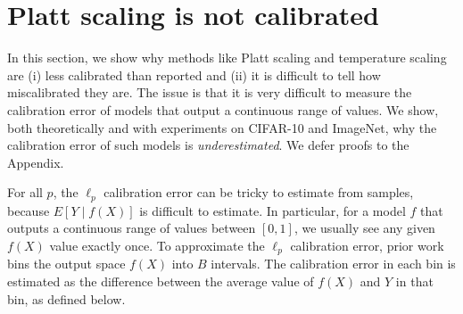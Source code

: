 \section{Platt scaling is not calibrated }
\label{sec:challenges-measuring}

In this section, we show why methods like Platt scaling and temperature scaling are (i) less calibrated than reported and (ii) it is difficult to tell how miscalibrated they are. The issue is that it is very difficult to measure the calibration error of models that output a continuous range of values. We show, both theoretically and with experiments on CIFAR-10 and ImageNet, why the calibration error of such models is \emph{underestimated}. We defer proofs to the Appendix.





For all $p$, the $\ell_p$ calibration error can be tricky to estimate from samples, because $E[Y \; | \; f(X)]$ is difficult to estimate.
In particular, for a model $f$ that outputs a continuous range of values between $[0, 1]$, we usually see any given $f(X)$ value exactly once.
To approximate the $\ell_p$ calibration error, prior work bins the output space $f(X)$ into $B$ intervals.
The calibration error in each bin is estimated as the difference between the average value of $f(X)$ and $Y$ in that bin, as defined below.

